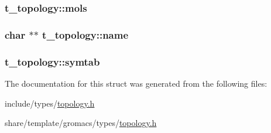 \hypertarget{structt__topology_a4b373c94708f6e2f7c1e9f24babf191c}{
\subsubsection[{mols}]{ {\bf t\-\_\-topology\-::mols}}}\label{structt__topology_a4b373c94708f6e2f7c1e9f24babf191c}
\hypertarget{structt__topology_aa6d824e6a3b3b65de4662eca20785752}{
\subsubsection[{name}]{\setlength{\rightskip}{0pt plus 5cm}char $\ast$$\ast$ {\bf t\-\_\-topology\-::name}}}\label{structt__topology_aa6d824e6a3b3b65de4662eca20785752}
\hypertarget{structt__topology_a54de39b6fe9274042a56db0cfd07b6b0}{
\subsubsection[{symtab}]{ {\bf t\-\_\-topology\-::symtab}}}\label{structt__topology_a54de39b6fe9274042a56db0cfd07b6b0}


\-The documentation for this struct was generated from the following files\-:\begin{DoxyCompactItemize}
\item 
include/types/\hyperlink{include_2types_2topology_8h}{topology.\-h}\item 
share/template/gromacs/types/\hyperlink{share_2template_2gromacs_2types_2topology_8h}{topology.\-h}\end{DoxyCompactItemize}
